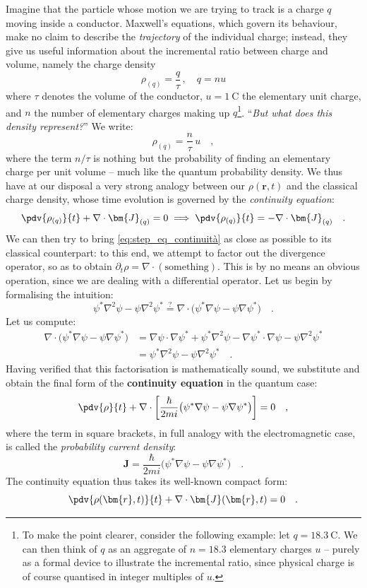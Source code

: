 Imagine that the particle whose motion we are trying to track is a charge $q$ moving inside a conductor. Maxwell's equations, which govern its behaviour, make no claim to describe the \emph{trajectory} of the individual charge; instead, they give us useful information about the incremental ratio between charge and volume, namely the charge density
\[
\rho_{(q)} = \frac{q}{\tau} \,, \quad q = nu
\]
where $\tau$ denotes the volume of the conductor, $u = \SI{1}{\coulomb}$ the elementary unit charge, and $n$ the number of elementary charges making up $q$\footnote{To make the point clearer, consider the following example: let $q = \SI{18.3}{\coulomb}$. We can then think of $q$ as an aggregate of $n = 18.3$ elementary charges $u$ -- purely as a formal device to illustrate the incremental ratio, since physical charge is of course quantised in integer multiples of $u$.}. ``\emph{But what does this density represent?}'' We write:
\[
    \rho_{(q)} = \frac{n}{\tau} \, u\quad,
\] 
where the term $n/\tau$ is nothing but the probability of finding an elementary charge per unit volume -- much like the quantum probability density. We thus have at our disposal a very strong analogy between our $\rho(\bm{r},t)$ and the classical charge density, whose time evolution is governed by the \emph{continuity equation}:
\[
    \pdv{\rho_{(q)}}{t} + \nabla \cdot \bm{J}_{(q)} = 0 \implies \pdv{\rho_{(q)}}{t} = -\nabla \cdot \bm{J}_{(q)} \quad.
\] 
We can then try to bring \eqref{eq:step_eq_continuità} as close as possible to its classical counterpart: to this end, we attempt to factor out the divergence operator, so as to obtain $\partial_t \rho = \nabla \cdot (\text{something})$. This is by no means an obvious operation, since we are dealing with a differential operator. Let us begin by formalising the intuition:
\[
    \psi^*\nabla^2\psi - \psi\nabla^2\psi^* \overset{?}{=} \nabla \cdot \big( \psi^*\nabla\psi - \psi\nabla\psi^* \big) \quad.
\]
Let us compute:
\[
\begin{aligned}
    \nabla \cdot \big( \psi^*\nabla\psi - \psi\nabla\psi^* \big) &= \nabla\psi\cdot\nabla\psi^* + \psi^*\nabla^2\psi - \nabla\psi^* \cdotp\nabla\psi - \psi\nabla^2\psi^* \\ &= \psi^*\nabla^2\psi - \psi\nabla^2\psi^* \quad.
\end{aligned}
\]
Having verified that this factorisation is mathematically sound, we substitute and obtain the final form of the \textbf{continuity equation} in the quantum case:
\[
    \pdv{\rho}{t} + \nabla \cdot \left[\frac{\hbar}{2mi}\big( \psi^*\nabla\psi - \psi\nabla\psi^* \big) \right] = 0 \quad,
\]
where the term in square brackets, in full analogy with the electromagnetic case, is called the \textit{probability current density}:
\[
    \bm{J} = \frac{\hbar}{2mi}\big( \psi^*\nabla\psi - \psi\nabla\psi^* \big) \quad.
\]
The continuity equation thus takes its well-known compact form:
\[
    \pdv{\rho(\bm{r}, t)}{t} + \nabla \cdot \bm{J}(\bm{r},t) = 0 \quad.
\]

